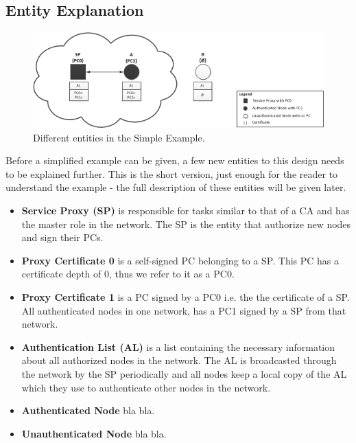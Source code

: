 \subsection{Entity Explanation}

\begin{figure}[ht!]
	\centering
  	\includegraphics{images/simple_example_entities.png}
  	\caption{Different entities in the Simple Example.}
	\label{fig:simple_example_entities}
\end{figure}

Before a simplified example can be given, a few new entities to this design
needs to be explained further. This is the short version, just enough for the
reader to understand the example - the full description of these entities will
be given later.

\begin{itemize}
  \item \textbf{Service Proxy (SP)} is responsible for tasks similar to that of
  	a \ac{CA} and has the master role in the network. The \ac{SP} is the entity
  	that authorize new nodes and sign their \ac{PC}s.
  \item \textbf{Proxy Certificate 0} is a self-signed \ac{PC} belonging to a
  	\ac{SP}. This \ac{PC} has a certificate depth of 0, thus we refer to it as a
  	\ac{PC0}.
  \item \textbf{Proxy Certificate 1} is a \ac{PC} signed by a \ac{PC0} i.e. the
  	the certificate of a \ac{SP}. All authenticated nodes in one network, has a
  	\ac{PC1} signed by a \ac{SP} from that network.
  \item \textbf{Authentication List (AL)} is a list containing the necessary
  	information about all authorized nodes in the network. The \ac{AL} is
  	broadcasted through the network by the \ac{SP} periodically and all nodes
  	keep a local copy of the \ac{AL} which they use to authenticate other nodes
  	in the network.
  \item \textbf{Authenticated Node} bla bla.
  \item \textbf{Unauthenticated Node} bla bla.
\end{itemize}


